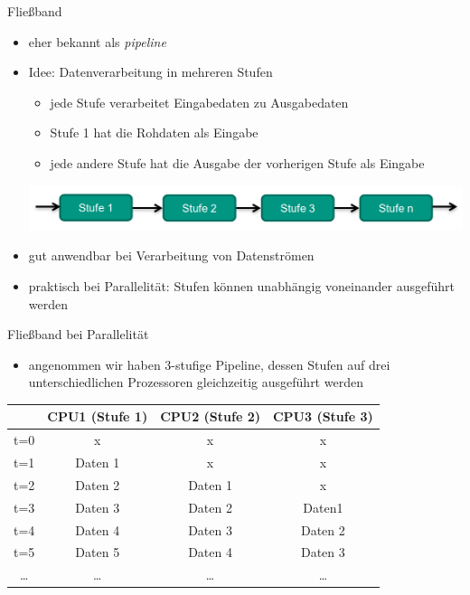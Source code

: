 \documentclass[18pt]{beamer}
\begin{document}
\begin{frame}{Fließband}
	\begin{itemize}
		\item eher bekannt als \emph{pipeline}
		\item Idee: Datenverarbeitung in mehreren Stufen
		\begin{itemize}
			\item jede Stufe verarbeitet Eingabedaten zu Ausgabedaten
			\item Stufe 1 hat die Rohdaten als Eingabe
			\item jede andere Stufe hat die Ausgabe der vorherigen Stufe als Eingabe
		\end{itemize}
		\centering	\includegraphics[scale=0.35]{pics/tut3/pipeline.png}
	\end{itemize}
		\pause
		\begin{itemize}
			\item gut anwendbar bei Verarbeitung von Datenströmen
			\item praktisch bei Parallelität: Stufen können unabhängig voneinander ausgeführt werden
		\end{itemize}
\end{frame}

\begin{frame}{Fließband bei Parallelität}
	\begin{itemize}
		\item angenommen wir haben 3-stufige Pipeline, dessen Stufen auf drei unterschiedlichen Prozessoren gleichzeitig ausgeführt werden
	\end{itemize}
	\begin{table}
		\begin{tabular}{c|c|c|c|}
				& CPU1 (Stufe 1) & CPU2 (Stufe 2) & CPU3 (Stufe 3) \\
				\hline
				t=0 & x & x & x \\
				\hline
			t=1 & Daten 1 & x & x \\
			\hline
			t=2 & Daten 2 & Daten 1 & x \\
			\hline
			t=3 & Daten 3 & Daten 2 & Daten1 \\
			\hline
			t=4 & Daten 4 & Daten 3 & Daten 2 \\
			\hline
			t=5 & Daten 5 & Daten 4 & Daten 3 \\
			\dots & \dots & \dots & \dots 
		\end{tabular}
	\end{table}
\end{frame}
\end{document}
